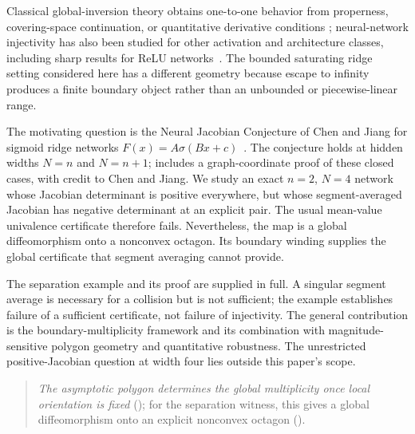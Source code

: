 \documentclass[11pt,twoside,leqno]{article}
\theoremstyle{plain}
\theoremstyle{definition}
\theoremstyle{remark}
\begin{document}
Classical global-inversion theory obtains one-to-one behavior from properness, covering-space continuation, or quantitative derivative conditions \cite{gutu-jaramillo,ruzhansky-sugimoto}; neural-network injectivity has also been studied for other activation and architecture classes, including sharp results for ReLU networks~\cite{puthawala}.  The bounded saturating ridge setting considered here has a different geometry because escape to infinity produces a finite boundary object rather than an unbounded or piecewise-linear range.

The motivating question is the Neural Jacobian Conjecture of Chen and Jiang for sigmoid ridge networks $F(x)=A\sigma(Bx+c)$~\cite{chen-jiang}. The conjecture holds at hidden widths $N=n$ and $N=n+1$;  includes a graph-coordinate proof of these closed cases, with credit to Chen and Jiang. We study an exact $n=2$, $N=4$ network whose Jacobian determinant is positive everywhere, but whose segment-averaged Jacobian has negative determinant at an explicit pair. The usual mean-value univalence certificate therefore fails. Nevertheless, the map is a global diffeomorphism onto a nonconvex octagon. Its boundary winding supplies the global certificate that segment averaging cannot provide.

The separation example and its proof are supplied in full. A singular segment average is necessary for a collision but is not sufficient; the example establishes failure of a sufficient certificate, not failure of injectivity. The general contribution is the boundary-multiplicity framework and its combination with magnitude-sensitive polygon geometry and quantitative robustness. The unrestricted positive-Jacobian question at width four lies outside this paper's scope.

\begin{quote}\emph{The asymptotic polygon determines the global multiplicity once local orientation is fixed} (); for the separation witness, this gives a global diffeomorphism onto an explicit nonconvex octagon ().\end{quote}
\end{document}
